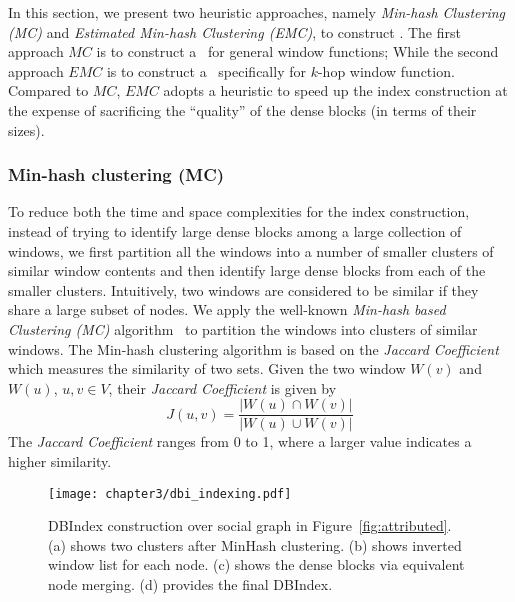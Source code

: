 In this section, we present two heuristic approaches, namely {\it Min-hash Clustering (MC)} and {\it Estimated Min-hash Clustering (EMC)}, to construct \DBIndex . The first approach $MC$ is to construct
a \DBIndex\ for general window functions; While the second approach $EMC$ is 
to construct a \DBIndex\ specifically for $k$-hop window function. Compared to $MC$, $EMC$
adopts a heuristic to speed up the index construction at the expense of sacrificing 
the ``quality'' of the dense blocks (in terms of their sizes).


\subsubsection{Min-hash clustering (MC)}
To reduce both the time and space complexities for the index construction,
instead of trying to identify large dense blocks among a large collection of windows,
we first partition all the windows 
into a number of smaller clusters of 
similar window contents and then identify large dense blocks 
from each of the smaller clusters.
Intuitively, two windows are considered to 
be similar if they share a large subset of nodes.
We apply the well-known {\it Min-hash based Clustering (MC)} algorithm~\cite{broder1997syntactic} 
to partition the windows into clusters of similar windows.
The Min-hash clustering algorithm is based on the
\emph{Jaccard Coefficient} which measures the similarity of two sets.  
Given the two window $W(v)$ and $W(u)$, $u,v \in V$,
their \emph{Jaccard Coefficient} is given by
\begin{equation} \label{eq:jacc_sim}
	J(u,v) = \frac{|W(u) \cap W(v)|}{|W(u) \cup W(v)|}
\end{equation}
The \emph{Jaccard Coefficient} ranges from 0 to 1, where a larger value indicates
a higher similarity.

\begin{figure}[h]
\centering
\texttt{[image: chapter3/dbi\_indexing.pdf]}
\caption{DBIndex construction over social graph in Figure~\ref{fig:attributed}. (a) shows two clusters after MinHash clustering. (b) shows inverted window list for each node. (c) shows the dense blocks via equivalent node merging. (d) provides the final DBIndex.}
\label{fig:dbi-indexing}
\end{figure}



